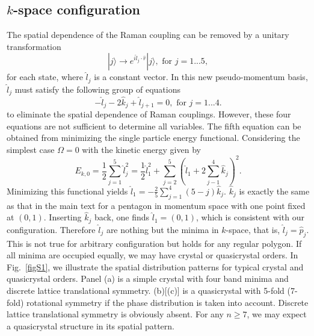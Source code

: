 \documentclass[twocolumn,prl,floatfix,citeautoscript,nofootinbib]{revtex4}
\begin{document}
\subsection{$k$-space configuration}

The spatial dependence of the Raman coupling can be removed by a unitary
transformation
\begin{equation}
|j\rangle \rightarrow e^{i\hat{l}_{j}\cdot \hat{r}}|j\rangle ,\text{ for }%
j=1...5,
\end{equation}%
for each state, where $\hat{l}_{j}$ is a constant vector. In this new
pseudo-momentum basis, $\hat{l}_{j}$ must satisfy the following group of
equations%
\begin{equation}
-\hat{l}_{j}-2\hat{k}_{j}+\hat{l}_{j+1}=0,\text{ for }j=1...4.
\end{equation}%
to eliminate the spatial dependence of Raman couplings. However, these four
equations are not sufficient to determine all variables. The fifth equation
can be obtained from minimizing the single particle energy functional.
Considering the simplest case $\Omega =0$ with the kinetic energy given by%
\begin{equation}
E_{k,0}=\frac{1}{2}\sum_{j=1}^{5}\hat{l}_{j}^{2}=\frac{1}{2}\hat{l}%
_{1}^{2}+\sum_{j=2}^{5}\left( \hat{l}_{1}+2\sum_{j-1}^{4}\hat{k}_{j}\right)
^{2}.
\end{equation}%
Minimizing this functional yields $\hat{l}_{1}=-\frac{2}{5}%
\sum_{j=1}^{4}(5-j)\hat{k}_{j}$. $\hat{k}_{j}$ is exactly the same as that
in the main text for a pentagon in momentum space with one point fixed at $%
(0,1)$. Inserting $\hat{k}_{j}$ back, one finds $\hat{l}_{1}=(0,1)$, which
is consistent with our configuration. Therefore $\hat{l}_{j}$ are nothing
but the minima in $k$-space, that is, $\hat{l}_{j}=\hat{p}_{j}$. This is not
true for arbitrary configuration but holds for any regular polygon. If all
minima are occupied equally, we may have crystal or quasicrystal orders. In
Fig.~\ref{figS1}, we illustrate the spatial distribution patterns for
typical crystal and quasicrystal orders. Panel (a) is a simple crystal with
four band minima and discrete lattice translational symmetry. (b)[(c)] is a
quasicrystal with 5-fold (7-fold) rotational symmetry if the phase
distribution is taken into account. Discrete lattice translational symmetry
is obviously absent. For any $n\geq 7$, we may expect a quasicrystal
structure in its spatial pattern.
\end{document}
